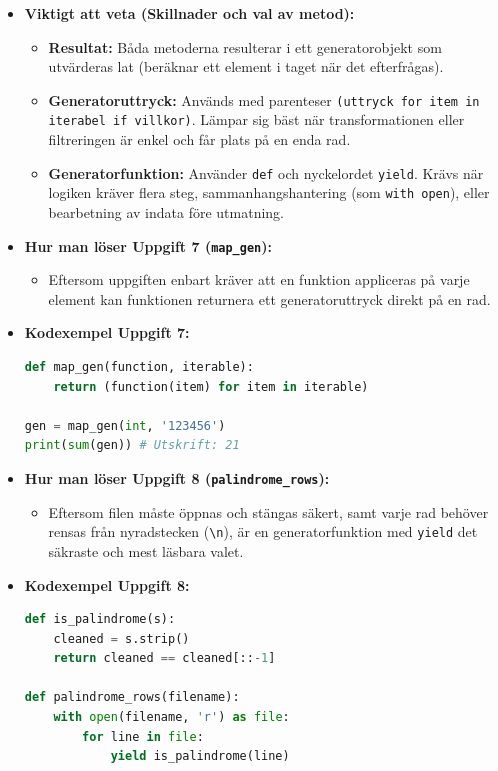 \documentclass{article}
\begin{document}
\begin{itemize}
    \item \textbf{Viktigt att veta (Skillnader och val av metod):}
    \begin{itemize}
        \item \textbf{Resultat:} Båda metoderna resulterar i ett generatorobjekt som utvärderas lat (beräknar ett element i taget när det efterfrågas).
        \item \textbf{Generatoruttryck:} Används med parenteser \texttt{(uttryck for item in iterabel if villkor)}. Lämpar sig bäst när transformationen eller filtreringen är enkel och får plats på en enda rad.
        \item \textbf{Generatorfunktion:} Använder \texttt{def} och nyckelordet \texttt{yield}. Krävs när logiken kräver flera steg, sammanhangshantering (som \texttt{with open}), eller bearbetning av indata före utmatning.
    \end{itemize}

    \item \textbf{Hur man löser Uppgift 7 (\texttt{map\_gen}):}
    \begin{itemize}
        \item Eftersom uppgiften enbart kräver att en funktion appliceras på varje element kan funktionen returnera ett generatoruttryck direkt på en rad.
    \end{itemize}

    \item \textbf{Kodexempel Uppgift 7:}
\begin{lstlisting}[language=Python]
def map_gen(function, iterable):
    return (function(item) for item in iterable)

gen = map_gen(int, '123456')
print(sum(gen)) # Utskrift: 21
\end{lstlisting}

    \item \textbf{Hur man löser Uppgift 8 (\texttt{palindrome\_rows}):}
    \begin{itemize}
        \item Eftersom filen måste öppnas och stängas säkert, samt varje rad behöver rensas från nyradstecken (\texttt{\textbackslash n}), är en generatorfunktion med \texttt{yield} det säkraste och mest läsbara valet.
    \end{itemize}

    \item \textbf{Kodexempel Uppgift 8:}
\begin{lstlisting}[language=Python]
def is_palindrome(s):
    cleaned = s.strip()
    return cleaned == cleaned[::-1]

def palindrome_rows(filename):
    with open(filename, 'r') as file:
        for line in file:
            yield is_palindrome(line)
\end{lstlisting}
\end{itemize}
\end{document}
